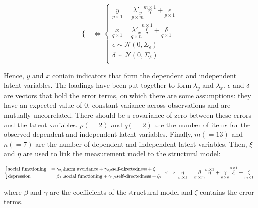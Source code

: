 \documentclass[11pt]{article}
\begin{document}
\begin{equation}
\begin{cases}
  \end{cases}
  \iff
  \begin{cases}
    \underset{p \times 1}{y} = \underset{p \times m}{\lambda'_y} \overset{m \times 1}{\eta} + \underset{p \times 1}{\epsilon} \\
    \underset{q \times 1}{x} = \underset{q \times n}{\lambda'_x} \overset{n \times 1}{\xi}  + \underset{q \times 1}{\delta} \\
    \epsilon \sim \mathcal{N}(0, \Sigma_\epsilon) \\
    \delta \sim \mathcal{N}(0, \Sigma_\delta) \\
  \end{cases}
\end{equation}

Hence, $y$ and $x$ contain indicators that form the dependent and independent
latent variables. The loadings have been put together to form $\lambda_y$ and
$\lambda_x$. $\epsilon$ and $\delta$ are vectors that hold the error terms, on
which there are some assumptions: they have an expected value of 0, constant
variance across observations and are mutually uncorrelated. There should be a
covariance of zero between these errors and the latent variables. $p (=2)$ and $q (=2)$
are the number of items for the observed dependent and independent latent
variables. Finally, $m (=13)$ and $n (=7)$ are the number of dependent and independent
latent variables. Then, $\xi$ and $\eta$ are used to link the measurement model
to the structural model:

\begin{equation}
  \small
  \label{eq:structural_model}
  \begin{cases}
    \textrm{social functioning} & = \gamma_{2,1} \textrm{harm avoidance}     + \gamma_{2,2} \textrm{self-directedness} + \zeta_1 \\
    \textrm{depression}         & = \beta_{1,2}  \textrm{social functioning} + \gamma_{1,2} \textrm{self-directedness} + \zeta_2 \\
  \end{cases}
  \iff
    \underset{m \times 1}{\eta} = \underset{m \times m}{\beta} \overset{m \times 1}{\eta}
                                  + \underset{n \times n}{\gamma} \overset{n \times 1}{\xi}
                                  + \underset{m \times 1}{\zeta} \\
\end{equation}

where $\beta$ and $\gamma$ are the coefficients of the structural model and
$\zeta$ contains the error terms.
\end{document}
